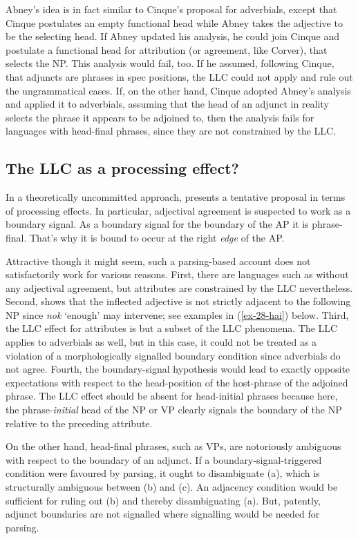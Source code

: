 \documentclass[output=paper
  ,nobabel
  ,uniformtopskip %
]{langscibook}
\begin{document}
\noindent
Abney's idea is in fact similar to Cinque's proposal for adverbials, except that Cinque postulates an empty functional head while Abney takes the adjective to be the selecting head. If Abney updated his analysis, he could join Cinque and postulate a functional head for attribution (or agreement, like Corver), that selects the NP. This analysis would fail, too. If he assumed, following Cinque, that adjuncts are phrases in spec positions, the LLC could not apply and rule out the ungrammatical cases. If, on the other hand, Cinque adopted Abney's analysis and applied it to adverbials, assuming that the head of an adjunct in reality selects the phrase it appears to be adjoined to, then the analysis fails for languages with head-final phrases, since they are not constrained by the LLC.

\subsection{The LLC as a processing effect?}\label{subsec-llc}

In a theoretically uncommitted approach, \citet{Fischer2016} presents a tentative proposal in terms of processing effects. In particular, adjectival agreement is suspected to work as a boundary signal. As a boundary signal for the boundary of the AP it is phrase-final. That's why it is bound to occur at the right \emph{edge} of the AP.

Attractive though it might seem, such a parsing-based account does not satisfactorily work for
various reasons. First, there are languages such as  without any adjectival agreement, but
attributes are constrained by the LLC nevertheless. Second,  shows that the inflected
adjective is not strictly adjacent to the following NP since \emph{nok} `enough' may intervene; see
examples in (\ref{ex-28-hai}) below. Third, the LLC effect for attributes is but a subset of the LLC
phenomena. The LLC applies to adverbials as well, but in this case, it could not be treated as a
violation of a morphologically signalled boundary condition since adverbials do not agree. Fourth,
the boundary-signal hypothesis would lead to exactly opposite expectations with respect to the
head-position of the host-phrase of the adjoined phrase. The LLC effect should be absent for
head-initial phrases because here, the phrase-\emph{initial} head of the NP or VP clearly signals
the boundary of the NP relative to the preceding attribute. 

On the other hand, head-final phrases,
such as  VPs, are notoriously ambiguous with respect to the boundary of an adjunct. 
If a boundary-signal-triggered condition were favoured by parsing, it ought to disambiguate (a), which is structurally ambiguous between (b) and (c). An adjacency condition would be sufficient for ruling out (b) and thereby disambiguating (a). But, patently, adjunct boundaries are not signalled where signalling would be needed for parsing.
\end{document}

